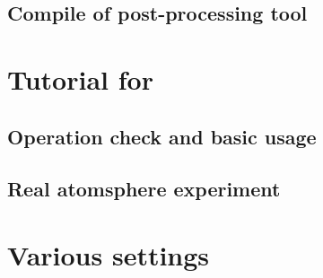 \documentclass[a4paper]{report}
\begin{document}
 \chapter{Compile of post-processing tool}
 


\part{Tutorial for \scalerm}
 \chapter{Operation check and basic usage} \label{chap:tutorial_ideal}
 
 
 
 


 \chapter{Real atomsphere experiment} \label{chap:tutorial_real}
 
 
 
 
 
 
 


% 
% 
% 


\part{Various settings} \label{part:basic_usel}
\end{document}
